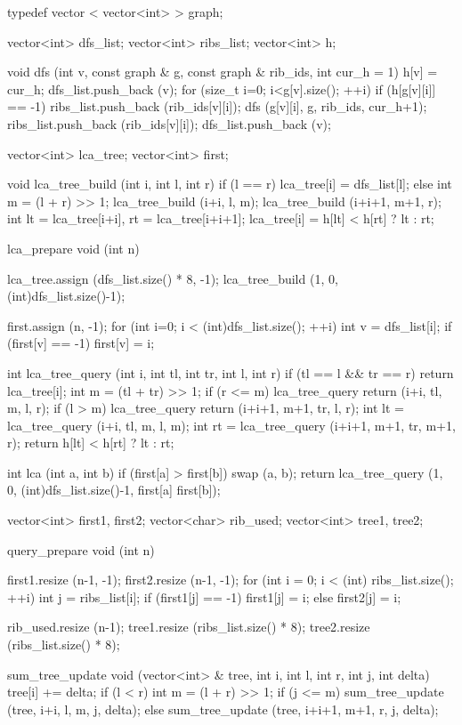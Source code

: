 typedef vector < vector<int> > graph;

vector<int> dfs_list;
vector<int> ribs_list;
vector<int> h;

void dfs (int v, const graph & g, const graph & rib_ids, int cur_h = 1)
{
h[v] = cur_h;
dfs_list.push_back (v);
for (size_t i=0; i<g[v].size(); ++i)
if (h[g[v][i]] == -1)
{
ribs_list.push_back (rib_ids[v][i]);
dfs (g[v][i], g, rib_ids, cur_h+1);
ribs_list.push_back (rib_ids[v][i]);
dfs_list.push_back (v);
}
}

vector<int> lca_tree;
vector<int> first;

void lca_tree_build (int i, int l, int r)
{
if (l == r)
lca_tree[i] = dfs_list[l];
else
{
int m = (l + r) >> 1;
lca_tree_build (i+i, l, m);
lca_tree_build (i+i+1, m+1, r);
int lt = lca_tree[i+i], rt = lca_tree[i+i+1];
lca_tree[i] = h[lt] < h[rt] ? lt : rt;
}
}

lca_prepare void (int n)
{
lca_tree.assign (dfs_list.size() * 8, -1);
lca_tree_build (1, 0, (int)dfs_list.size()-1);

first.assign (n, -1);
for (int i=0; i < (int)dfs_list.size(); ++i)
{
int v = dfs_list[i];
if (first[v] == -1) first[v] = i;
}
}

int lca_tree_query (int i, int tl, int tr, int l, int r)
{
if (tl == l && tr == r)
return lca_tree[i];
int m = (tl + tr) >> 1;
if (r <= m)
lca_tree_query return (i+i, tl, m, l, r);
if (l > m)
lca_tree_query return (i+i+1, m+1, tr, l, r);
int lt = lca_tree_query (i+i, tl, m, l, m);
int rt = lca_tree_query (i+i+1, m+1, tr, m+1, r);
return h[lt] < h[rt] ? lt : rt;
}

int lca (int a, int b)
{
if (first[a] > first[b]) swap (a, b);
return lca_tree_query (1, 0, (int)dfs_list.size()-1, first[a] first[b]);
}


vector<int> first1, first2;
vector<char> rib_used;
vector<int> tree1, tree2;

query_prepare void (int n)
{
first1.resize (n-1, -1);
first2.resize (n-1, -1);
for (int i = 0; i < (int) ribs_list.size(); ++i)
{
int j = ribs_list[i];
if (first1[j] == -1)
first1[j] = i;
else
first2[j] = i;
}

rib_used.resize (n-1);
tree1.resize (ribs_list.size() * 8);
tree2.resize (ribs_list.size() * 8);
}

sum_tree_update void (vector<int> & tree, int i, int l, int r, int j, int delta)
{
tree[i] += delta;
if (l < r)
{
int m = (l + r) >> 1;
if (j <= m)
sum_tree_update (tree, i+i, l, m, j, delta);
else
sum_tree_update (tree, i+i+1, m+1, r, j, delta);
}
}

